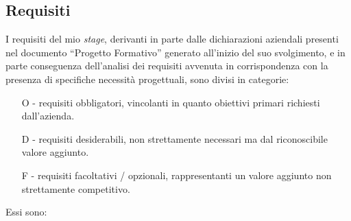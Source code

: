 \subsection{Requisiti}
I requisiti del mio \emph{stage}, derivanti in parte dalle dichiarazioni aziendali presenti nel documento “Progetto Formativo” generato all'inizio del suo svolgimento, e in parte conseguenza dell'analisi dei requisiti avvenuta in corrispondenza con la presenza di specifiche necessità progettuali, sono divisi in categorie:
\begin{enumerate}
	\item[O -]requisiti obbligatori, vincolanti in quanto obiettivi primari richiesti dall'azienda.
    \item[D -]requisiti desiderabili, non strettamente necessari ma dal riconoscibile valore aggiunto.
    \item[F -]requisiti facoltativi / opzionali, rappresentanti un valore aggiunto non strettamente competitivo.\\
\end{enumerate}
Essi sono:
